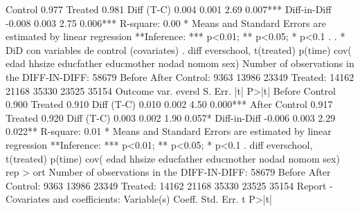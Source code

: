    Control      {\VBAR} 0.977   {\VBAR}         {\VBAR}         {\VBAR} 
   Treated      {\VBAR} 0.981   {\VBAR}         {\VBAR}         {\VBAR} 
   Diff (T-C)   {\VBAR} 0.004   {\VBAR} 0.001   {\VBAR} 2.69    {\VBAR} 0.007***
                {\VBAR}         {\VBAR}         {\VBAR}         {\VBAR} 
Diff-in-Diff    {\VBAR} -0.008  {\VBAR} 0.003   {\VBAR} 2.75    {\VBAR} 0.006***
R-square:    0.00
* Means and Standard Errors are estimated by linear regression
**Inference: *** p<0.01; ** p<0.05; * p<0.1
{\smallskip}
. 
. * DiD con variables de control (covariates)
. diff everschool, t(treated) p(time) cov( edad hhsize educfather educmother nodad nomom  sex)
{}
{\smallskip}
{}
Number of observations in the DIFF-IN-DIFF: 58679
            Before         After    
   Control: 9363           13986       23349
   Treated: 14162          21168       35330
            23525          35154
 Outcome var.   {\VBAR} evers{\tytilde}l {\VBAR} S. Err. {\VBAR}   |t|   {\VBAR}  P>|t|
Before          {\VBAR}         {\VBAR}         {\VBAR}         {\VBAR} 
   Control      {\VBAR} 0.900   {\VBAR}         {\VBAR}         {\VBAR} 
   Treated      {\VBAR} 0.910   {\VBAR}         {\VBAR}         {\VBAR} 
   Diff (T-C)   {\VBAR} 0.010   {\VBAR} 0.002   {\VBAR} 4.50    {\VBAR} 0.000***
After           {\VBAR}         {\VBAR}         {\VBAR}         {\VBAR} 
   Control      {\VBAR} 0.917   {\VBAR}         {\VBAR}         {\VBAR} 
   Treated      {\VBAR} 0.920   {\VBAR}         {\VBAR}         {\VBAR} 
   Diff (T-C)   {\VBAR} 0.003   {\VBAR} 0.002   {\VBAR} 1.90    {\VBAR} 0.057*
                {\VBAR}         {\VBAR}         {\VBAR}         {\VBAR} 
Diff-in-Diff    {\VBAR} -0.006  {\VBAR} 0.003   {\VBAR} 2.29    {\VBAR} 0.022**
R-square:    0.01
* Means and Standard Errors are estimated by linear regression
**Inference: *** p<0.01; ** p<0.05; * p<0.1
{\smallskip}
. diff everschool, t(treated) p(time) cov( edad hhsize educfather educmother nodad nomom  sex) rep
> ort
{}
{\smallskip}
{}
Number of observations in the DIFF-IN-DIFF: 58679
            Before         After    
   Control: 9363           13986       23349
   Treated: 14162          21168       35330
            23525          35154
Report - Covariates and coefficients:
 Variable(s)         {\VBAR}   Coeff.   {\VBAR} Std. Err. {\VBAR}    t    {\VBAR}  P>|t|
